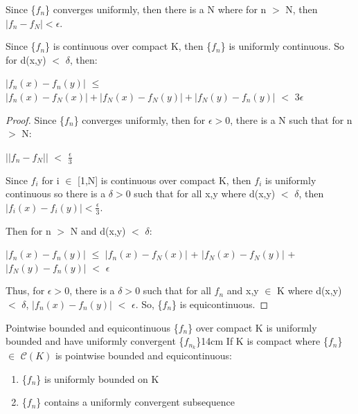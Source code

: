     \begin{intuition}
        Since \{$f_n$\} converges uniformly, then there is a N where for n $>$ N,
        then $|f_n - f_N| < \epsilon$.

        Since \{$f_n$\} is continuous over compact K, then
        \{$f_n$\} is uniformly continuous. So for d(x,y) $<$ $\delta$, then:

        \hspace{0.5cm}
        $|f_n(x) - f_n(y)|$
        $\leq$ $|f_n(x) - f_N(x)| + |f_N(x) - f_N(y)| + |f_N(y) - f_n(y)|$
        $<$ $3\epsilon$
    \end{intuition}

    \vspace{0.1cm}

    \begin{proof}
        Since \{$f_n$\} converges uniformly, then for $\epsilon > 0$, there is a
        N such that for n $>$ N:

        \hspace{0.5cm}
        $||f_n - f_N||$ $<$ $\frac{\epsilon}{3}$

        Since $f_i$ for i $\in$ [1,N] is continuous over compact K, then
        $f_i$ is uniformly continuous so there is a $\delta > 0$ such that for
        all x,y where d(x,y) $<$ $\delta$, then
        $|f_i(x) - f_i(y)| < \frac{\epsilon}{3}$.

        Then for n $>$ N and d(x,y) $<$ $\delta$:

        \hspace{0.5cm}
        $|f_n(x) - f_n(y)|$
        $\leq$ $|f_n(x) - f_N(x)|$ + $|f_N(x) - f_N(y)|$ + $|f_N(y) - f_n(y)|$
        $<$ $\epsilon$

        Thus, for $\epsilon > 0$, there is a $\delta > 0$ such that for all $f_n$
        and x,y $\in$ K where d(x,y) $<$ $\delta$,
        $|f_n(x) - f_n(y)|$ $<$ $\epsilon$.
        So, \{$f_n$\} is equicontinuous.
    \end{proof}

    \vspace{0.5cm}



    \begin{wtheorem}{Pointwise bounded and equicontinuous \{$f_n$\} over compact K
    is uniformly bounded and have uniformly convergent \{$f_{n_k}$\}}{14cm}
        If K is compact where \{$f_n$\} $\in$ $\mathscr{C}(K)$ is pointwise bounded
        and equicontinuous:

        \begin{enumerate}[label=(\alph*), leftmargin=1.5cm, itemsep=0.1cm]
            \item \{$f_n$\} is uniformly bounded on K
            
            \item \{$f_n$\} contains a uniformly convergent subsequence
        \end{enumerate}
    \end{wtheorem}

